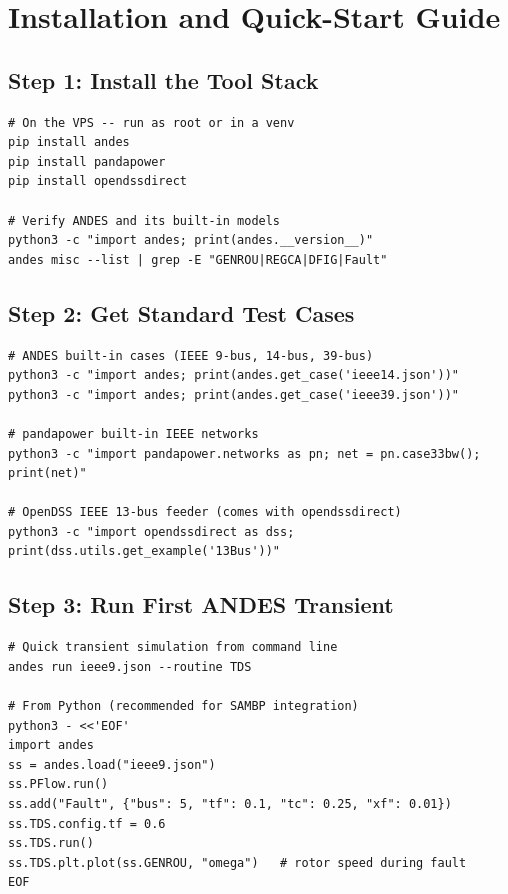 \documentclass[11pt,a4paper]{article}
\begin{document}
\section{Installation and Quick-Start Guide}

\subsection{Step 1: Install the Tool Stack}

\begin{lstlisting}[style=bash]
# On the VPS -- run as root or in a venv
pip install andes
pip install pandapower
pip install opendssdirect

# Verify ANDES and its built-in models
python3 -c "import andes; print(andes.__version__)"
andes misc --list | grep -E "GENROU|REGCA|DFIG|Fault"
\end{lstlisting}

\subsection{Step 2: Get Standard Test Cases}

\begin{lstlisting}[style=bash]
# ANDES built-in cases (IEEE 9-bus, 14-bus, 39-bus)
python3 -c "import andes; print(andes.get_case('ieee14.json'))"
python3 -c "import andes; print(andes.get_case('ieee39.json'))"

# pandapower built-in IEEE networks
python3 -c "import pandapower.networks as pn; net = pn.case33bw(); print(net)"

# OpenDSS IEEE 13-bus feeder (comes with opendssdirect)
python3 -c "import opendssdirect as dss; print(dss.utils.get_example('13Bus'))"
\end{lstlisting}

\subsection{Step 3: Run First ANDES Transient}

\begin{lstlisting}[style=bash]
# Quick transient simulation from command line
andes run ieee9.json --routine TDS

# From Python (recommended for SAMBP integration)
python3 - <<'EOF'
import andes
ss = andes.load("ieee9.json")
ss.PFlow.run()
ss.add("Fault", {"bus": 5, "tf": 0.1, "tc": 0.25, "xf": 0.01})
ss.TDS.config.tf = 0.6
ss.TDS.run()
ss.TDS.plt.plot(ss.GENROU, "omega")   # rotor speed during fault
EOF
\end{lstlisting}
\end{document}
